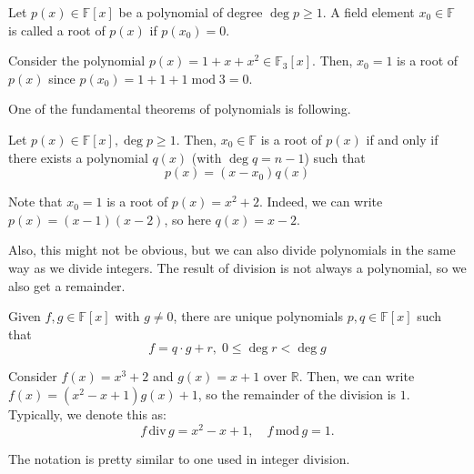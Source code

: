 \documentclass[../lecture-notes.tex]{subfiles}
\begin{document}
\begin{definition}
    Let $p(x) \in \mathbb{F}[x]$ be a polynomial of degree $\deg p \geq 1$. A field element $x_0 \in \mathbb{F}$ is called a root of $p(x)$ if $p(x_0) = 0$.
\end{definition}

\begin{example}
    Consider the polynomial $p(x) = 1 + x + x^2 \in \mathbb{F}_3[x]$. Then, $x_0=1$ is a root of $p(x)$ since $p(x_0) = 1 + 1 + 1 \; \text{mod} \; 3 = 0$.
\end{example}

One of the fundamental theorems of polynomials is following.

\begin{theorem}
    Let $p(x) \in \mathbb{F}[x], \deg p \geq 1$. Then, $x_0 \in \mathbb{F}$ is a root of $p(x)$ if and only if there exists a polynomial $q(x)$ (with $\deg q = n-1$) such that
    \begin{equation}
        p(x) = (x-x_0)q(x)
    \end{equation}
\end{theorem}

\begin{example}
    Note that $x_0=1$ is a root of $p(x) = x^2+2$. Indeed, we can write $p(x) = (x-1)(x-2)$, so here $q(x) = x-2$.
\end{example}

Also, this might not be obvious, but we can also divide polynomials in the same way as we divide integers. The result of division is not always a polynomial, so we also get a remainder.

\begin{theorem}
    Given $f,g \in \mathbb{F}[x]$ with $g \neq 0$, there are unique polynomials $p,q \in \mathbb{F}[x]$ such that 
    \begin{equation}
        f = q \cdot g + r, \; 0 \leq \deg r < \deg g
    \end{equation}
\end{theorem}

\begin{example}
    Consider $f(x) = x^3+2$ and $g(x) = x+1$ over $\mathbb{R}$. Then, we can write $f(x) = (x^2-x+1)g(x) + 1$, so the remainder of the division is $1$. Typically, we denote this as:
    \begin{equation}
        f \, \text{div} \, g = x^2-x+1, \quad f \, \text{mod} \, g = 1.
    \end{equation}

    The notation is pretty similar to one used in integer division.
\end{example}
\end{document}
